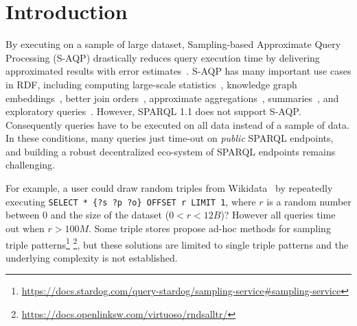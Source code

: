 
\section{Introduction}

By executing on a sample of large dataset, Sampling-based Approximate
Query Processing (S-AQP) drastically reduces query execution time by
delivering approximated results with error
estimates~\cite{DBLP:conf/sigmod/AgarwalMKTJMMS14}. S-AQP has many
important use cases in RDF, including computing large-scale
statistics~\cite{soulet2019anytime,10.1007/978-3-319-18818-8_14},
knowledge graph embeddings~\cite{ristoski2016rdf2vec}, better join
orders~\cite{DBLP:conf/cidr/LeisRGK017}, approximate
aggregations~\cite{wang2022approximate},
summaries~\cite{10.1007/978-3-030-49461-2_10}, and exploratory
queries~\cite{DBLP:conf/sigmod/AgarwalMKTJMMS14}.
%
However, SPARQL 1.1 does not support S-AQP. Consequently queries have
to be executed on all data instead of a sample of data. In these
conditions, many queries just time-out on \emph{public} SPARQL
endpoints, and building a robust decentralized eco-system of SPARQL
endpoints remains challenging.

%
For example, a user could draw random triples from Wikidata~\cite{soulet2019anytime}
by repeatedly executing \verb|SELECT * {?s ?p ?o} OFFSET r LIMIT 1|,
where $r$ is a random number between $0$ and
the size of the dataset ($0<r<12B$)? However all queries time out when $r > 100M$.
Some triple stores propose ad-hoc methods for sampling
triple patterns\footnote{\url{https://docs.stardog.com/query-stardog/sampling-service\#sampling-service}}
\footnote{\url{https://docs.openlinksw.com/virtuoso/rndsalltr/}},
but these solutions are limited to single triple patterns and the
underlying complexity is not established.
%

